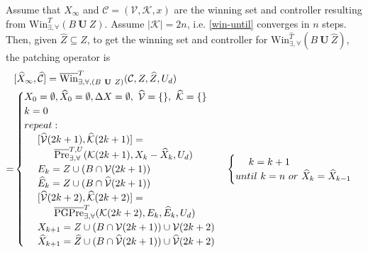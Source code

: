 Assume that $ X_\infty $ and $ \mathcal{C}=(\mathcal{V},\mathcal{K},x) $ are the winning set and controller resulting from $ \text{Win}_{\exists,\forall}^{T}(B\mathbf{\ U\ }Z) $. Assume $ \vert \mathcal{K}\vert = 2n $, i.e. \eqref{win-until} converges in $ n $ steps. Then, given $ \widehat{Z}\subseteq Z $, to get the winning set and controller for $ \text{Win}_{\exists,\forall}^{\widehat{T}}(B\mathbf{\ U\ }\widehat{Z}) $, the patching operator is
{\small\begin{align}
\begin{split}
&[\widehat{X}_\infty, \widehat{\mathcal{C}}]=\overline{\text{Win}}^{T}_{\exists,\forall, (B\mathbf{\ U\ }Z)}(\mathcal{C},Z,\widehat{Z}, U_d)\\
=&\begin{cases}
X_0 = \emptyset, \widehat{X}_0 = \emptyset, \Delta X = \emptyset, \ \widehat{\mathcal{V}}=\{\},\ \widehat{\mathcal{K}}=\{\}\\
{\color{black} k = 0}\\
{\color{black} repeat:}\\
\ \ \ \ [\widehat{\mathcal{V}}(2k+1),\widehat{\mathcal{K}}(2k+1)] =\\ \ \ \ \ \ \ \ \ \  \overline{\text{Pre}}_{\exists,\forall}^{T,U}(\mathcal{K}(2k+1),X_{k}-\widehat{X}_{k}, U_d)\\
\ \ \ \ E_k = Z\cup (B\cap \mathcal{V}(2k+1))\\
\ \ \ \  \widehat{E}_k =  Z\cup (B\cap \widehat{\mathcal{V}}(2k+1))\\
\ \ \ \ [\widehat{\mathcal{V}}(2k+2),\widehat{\mathcal{K}}(2k+2)] =\\ \ \ \ \ \ \ \ \ \  \overline{\text{PGPre}}_{\exists,\forall}^{T}(\mathcal{K}(2k+2),E_k, \widehat{E}_k,U_d)\\ 
\ \ \ \ X_{k+1} = Z\cup (B\cap \mathcal{V}(2k+1)) \cup \mathcal{V}(2k+2)\\
\ \ \ \ \widehat{X}_{k+1} =\widehat{Z}\cup (B\cap \widehat{\mathcal{V}}(2k+1)) \cup \widehat{\mathcal{V}}(2k+2)\\
\end{cases}
\begin{cases}
\ \ \ \ {\color{black} k = k +1}\\
{\color{black} until \ k = n \ or \ \widehat{X}_{k}=\widehat{X}_{k-1}}\\

\end{cases}
\end{split}
\end{align}}
